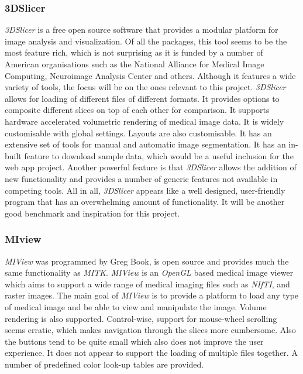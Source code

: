 \documentclass[a4paper,11pt,titlepage]{article}
\begin{document}
\subsubsection{3DSlicer}
\textit{3DSlicer} is a free open source software that provides a modular platform for image analysis and visualization. Of all the packages, this tool seems to be the most feature rich, which is not surprising as it is funded by a number of American organisations such as  the National Alliance for Medical Image Computing, Neuroimage Analysis Center and others. Although it features a wide variety of tools, the focus will be on the ones relevant to this project. \textit{3DSlicer} allows for loading of different files of different formats. It provides options to composite different slices on top of each other for comparison. It supports hardware accelerated volumetric rendering of medical image data. It is widely customisable with global settings. Layouts are also customisable. It has an extensive set of tools for manual and automatic image segmentation. It has an in-built feature to download sample data, which would be a useful inclusion for the web app project. Another powerful feature is that \textit{3DSlicer} allows the addition of new functionality and provides a number of generic features not available in competing tools. All in all, \textit{3DSlicer} appears like a well designed, user-friendly program that has an overwhelming amount of functionality. It will be another good benchmark and inspiration for this project.

\subsubsection{MIview}
\textit{MIView} was programmed by Greg Book, is open source and provides much the same functionality as \textit{MITK}. \textit{MIView} is an \textit{OpenGL} based medical image viewer which aims to support a wide range of medical imaging files such as \textit{NIfTI}, and raster images. The main goal of \textit{MIView} is to provide a platform to load any type of medical image and be able to view and manipulate the image. Volume rendering is also supported. Control-wise, support for mouse-wheel scrolling seems erratic, which makes navigation through the slices more cumbersome. Also the buttons tend to be quite small which also does not improve the user experience. It does not appear to support the loading of multiple files together. A number of predefined color look-up tables are provided.
\end{document}
